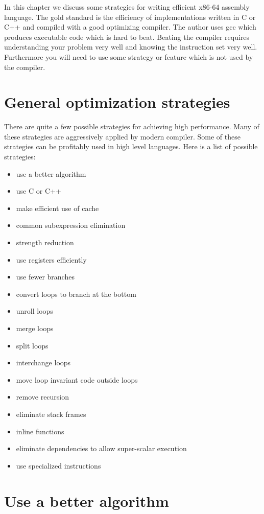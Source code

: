\documentclass[11pt,b5paper]{book}
\begin{document}
In this chapter we discuss some strategies for writing efficient x86-64 assembly language.
The gold standard is the efficiency of implementations written in C or C++ and compiled with
a good optimizing compiler.
The author uses gcc which produces executable code which is hard to beat.
Beating the compiler requires understanding your problem very well and knowing the instruction set
very well.
Furthermore you will need to use some strategy or feature which is not used by the compiler.

\section{General optimization strategies}

There are quite a few possible strategies for achieving high performance.
Many of these strategies are aggressively applied by modern compiler.
Some of these strategies can be profitably used in high level languages.
Here is a list of possible strategies:
\begin{itemize}
\item use a better algorithm
\item use C or C++
\item make efficient use of cache
\item common subexpression elimination
\item strength reduction
\item use registers efficiently
\item use fewer branches
\item convert loops to branch at the bottom
\item unroll loops
\item merge loops
\item split loops
\item interchange loops
\item move loop invariant code outside loops
\item remove recursion
\item eliminate stack frames
\item inline functions
\item eliminate dependencies to allow super-scalar execution
\item use specialized instructions
\end{itemize}

\section{Use a better algorithm}
\end{document}

